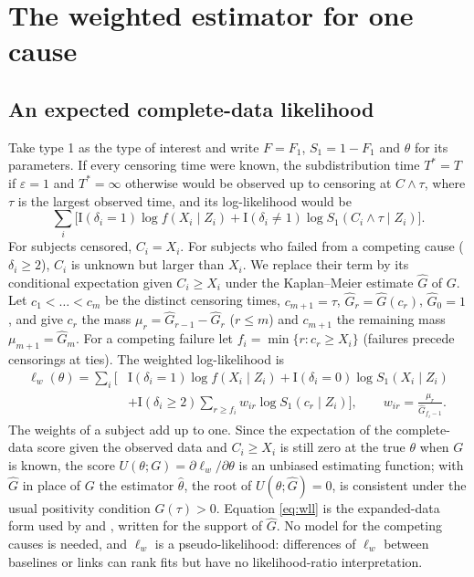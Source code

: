 \documentclass[11pt]{article}
\newcommand{\I}{\mathrm{I}}
\newcommand{\Ghat}{\widehat G}
\begin{document}
\section{The weighted estimator for one cause}\label{sec:weighted}
\subsection{An expected complete-data likelihood}
Take type 1 as the type of interest and write $F = F_1$, $S_1 = 1 - F_1$ and $\theta$ for its
parameters. If every censoring time were known, the subdistribution time $T^* = T$ if
$\varepsilon = 1$ and $T^* = \infty$ otherwise \citep{fine1999} would be observed up to censoring at
$C \wedge \tau$, where $\tau$ is the largest observed time, and its log-likelihood would be
\begin{equation}\label{eq:complete}
\sum_i \Big[ \I(\delta_i = 1)\log f(X_i \mid Z_i) + \I(\delta_i \ne 1) \log S_1(C_i \wedge \tau \mid Z_i) \Big].
\end{equation}
For subjects censored, $C_i = X_i$. For subjects who failed from a competing cause ($\delta_i \ge 2$),
$C_i$ is unknown but larger than $X_i$. We replace their term by its conditional expectation given
$C_i \ge X_i$ under the Kaplan--Meier estimate $\Ghat$ of $G$. Let $c_1 < \dots < c_m$ be the
distinct censoring times, $c_{m+1} = \tau$, $\Ghat_r = \Ghat(c_r)$, $\Ghat_0 = 1$, and give
$c_r$ the mass $\mu_r = \Ghat_{r-1} - \Ghat_r$ ($r \le m$) and $c_{m+1}$ the remaining mass
$\mu_{m+1} = \Ghat_m$. For a competing failure let $f_i = \min\{r : c_r \ge X_i\}$ (failures
precede censorings at ties). The weighted log-likelihood is
\begin{equation}\label{eq:wll}
\begin{aligned}
\ell_w(\theta) = \sum_i \Big[ &\I(\delta_i = 1) \log f(X_i \mid Z_i) + \I(\delta_i = 0) \log S_1(X_i \mid Z_i)\\
 &+ \I(\delta_i \ge 2) \sum_{r \ge f_i} w_{ir} \log S_1(c_r \mid Z_i) \Big],
 \qquad w_{ir} = \frac{\mu_r}{\Ghat_{f_i - 1}}.
\end{aligned}
\end{equation}
The weights of a subject add up to one. Since the expectation of the complete-data score given
the observed data and $C_i \ge X_i$ is still zero at the true $\theta$ when $G$ is known, the
score $U(\theta; G) = \partial \ell_w / \partial\theta$ is an unbiased estimating function; with
$\Ghat$ in place of $G$ the estimator $\hat\theta$, the root of $U(\theta; \Ghat) = 0$, is consistent
under the usual positivity condition $G(\tau) > 0$. Equation \eqref{eq:wll} is the expanded-data
form used by \citet{geskus2011} and \citet{lambert2017}, written for the support of $\Ghat$. No model
for the competing causes is needed, and $\ell_w$ is a pseudo-likelihood: differences of $\ell_w$
between baselines or links can rank fits but have no likelihood-ratio interpretation.
\end{document}
